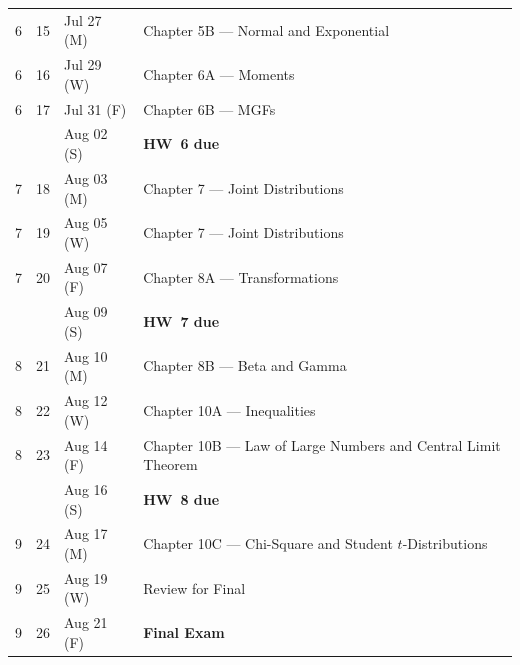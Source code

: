 \documentclass[11pt]{article}
\begin{document}
\begin{longtable}{@{}cclp{}@{}}
6 & 15 & Jul 27 (M) & Chapter 5B --- Normal and Exponential \\
6 & 16 & Jul 29 (W) & Chapter 6A --- Moments \\
6 & 17 & Jul 31 (F) & Chapter 6B --- MGFs \\
  &    & Aug 02 (S) & \textbf{\textcolor{uwpurple}{HW~6 due}} \\

7 & 18 & Aug 03 (M) & Chapter 7 --- Joint Distributions \\
7 & 19 & Aug 05 (W) & Chapter 7 --- Joint Distributions \\
7 & 20 & Aug 07 (F) & Chapter 8A --- Transformations \\
  &    & Aug 09 (S) & \textbf{\textcolor{uwpurple}{HW~7 due}} \\

8 & 21 & Aug 10 (M) & Chapter 8B --- Beta and Gamma \\
8 & 22 & Aug 12 (W) & Chapter 10A --- Inequalities \\
8 & 23 & Aug 14 (F) & Chapter 10B --- Law of Large Numbers and Central Limit Theorem \\
  &    & Aug 16 (S) & \textbf{\textcolor{uwpurple}{HW~8 due}} \\

9 & 24 & Aug 17 (M) & Chapter 10C --- Chi-Square and Student \(t\)-Distributions \\
9 & 25 & Aug 19 (W) & Review for Final \\
9 & 26 & Aug 21 (F) & \textbf{\textcolor{examcolor}{Final Exam}} \\

\bottomrule
\end{longtable}
\end{document}
